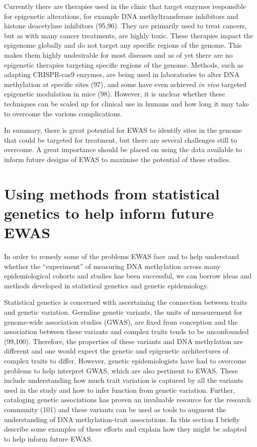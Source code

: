 \documentclass[11pt,oneside]{bristolthesis}
\begin{document}
Currently there are therapies used in the clinic that target enzymes responsible for epigenetic alterations, for example DNA methyltransferase inhibitors and histone deacetylase inhibitors (95,96). They are primarily used to treat cancers, but as with many cancer treatments, are highly toxic. These therapies impact the epigenome globally and do not target any specific regions of the genome. This makes them highly undesirable for most diseases and as of yet there are no epigenetic therapies targeting specific regions of the genome. Methods, such as adapting CRISPR-cas9 enzymes, are being used in laboratories to alter DNA methylation at specific sites (97), and some have even achieved \emph{in vivo} targeted epigenetic modulation in mice (98). However, it is unclear whether these techniques can be scaled up for clinical use in humans and how long it may take to overcome the various complications.

In summary, there is great potential for EWAS to identify sites in the genome that could be targeted for treatment, but there are several challenges still to overcome. A great importance should be placed on using the data available to inform future designs of EWAS to maximise the potential of these studies.

\hypertarget{genetics-in-ewas}{%
\section{Using methods from statistical genetics to help inform future EWAS}\label{genetics-in-ewas}}

In order to remedy some of the problems EWAS face and to help understand whether the ``experiment'' of measuring DNA methylation across many epidemiological cohorts and studies has been successful, we can borrow ideas and methods developed in statistical genetics and genetic epidemiology.

Statistical genetics is concerned with ascertaining the connection between traits and genetic variation. Germline genetic variants, the units of measurement for genome-wide association studies (GWAS), are fixed from conception and the association between these variants and complex traits tends to be unconfounded (99,100). Therefore, the properties of these variants and DNA methylation are different and one would expect the genetic and epigenetic architectures of complex traits to differ. However, genetic epidemiologists have had to overcome problems to help interpret GWAS, which are also pertinent to EWAS. These include understanding how much trait variation is captured by all the variants used in the study and how to infer function from genetic variation. Further, cataloging genetic associations has proven an invaluable resource for the research community (101) and these variants can be used as tools to augment the understanding of DNA methylation-trait associations. In this section I briefly describe some examples of these efforts and explain how they might be adapted to help inform future EWAS.
\end{document}
